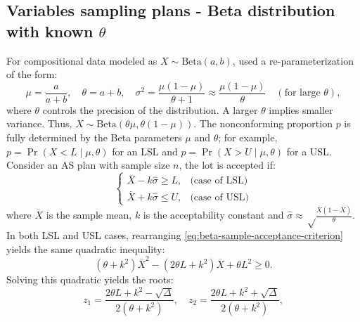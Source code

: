 \subsection{\texorpdfstring{Variables sampling plans - Beta distribution with known \(\theta\)}{Variables sampling plans - Beta distribution with known \textbackslash theta}}\label{variables-sampling-plans---beta-distribution-with-known-theta}

For compositional data modeled as \(X \sim \text{Beta}(a, b)\),
\citet{govindaraju2015sampling} used a re-parameterization of the form:
\begin{equation}
\mu = \frac{a}{a + b}, \quad \theta = a + b, \quad \sigma^2 = \frac{\mu\left(1 - \mu\right)}{\theta + 1} \approx \frac{\mu\left(1 - \mu\right)}{\theta} \quad (\text{for large } \theta),
  \label{eq:beta-re-parameterizing}
\end{equation}
where \(\theta\) controls the precision of the distribution. A larger \(\theta\)
implies smaller variance. Thus, \(X \sim \text{Beta}\left(\theta \mu, \theta(1 - \mu)\right)\).
The nonconforming proportion \(p\) is fully determined by the Beta parameters
\(\mu\) and \(\theta\); for example, \(p = \Pr(X < L \mid \mu, \theta)\) for an
LSL and \(p = \Pr(X > U \mid \mu, \theta)\) for a USL.
Consider an AS plan with sample size \(n\), the lot is accepted if:
\begin{equation}
\begin{cases}
\overline{X} - k\hat{\sigma} \geq L, & \text{(case of LSL)} \\
\overline{X} + k\hat{\sigma} \leq U, & \text{(case of USL)}
\end{cases}
  \label{eq:beta-sample-acceptance-criterion}
\end{equation}
where \(\overline{X}\) is the sample mean, \(k\) is the acceptability constant
and
\(\hat{\sigma} \approx \sqrt \frac{\overline{X}(1-\overline{X})}{\theta}.\)
In both LSL and USL cases, rearranging \eqref{eq:beta-sample-acceptance-criterion}
yields the same quadratic inequality:
\begin{equation}
\left(\theta + k^2\right)\overline{X}^2 - \left(2\theta L + k^2\right)\overline{X} + \theta L^2 \geq 0. 
  \label{eq:beta-quadratic-inequality}
\end{equation}
Solving this quadratic yields the roots:
\begin{equation}
z_1 = \frac{2\theta L + k^2 - \sqrt{\Delta}}{2\left(\theta + k^2\right)}, \quad
z_2 = \frac{2\theta L + k^2 + \sqrt{\Delta}}{2\left(\theta + k^2\right)}, 
  \label{eq:beta-quadratic-roots}
\end{equation}
